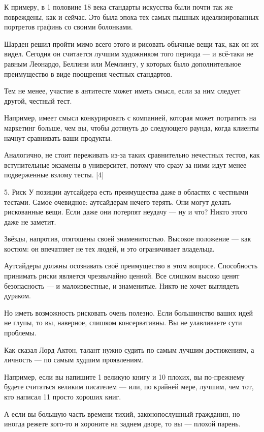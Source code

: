 \documentclass[ebook,12pt,oneside,openany]{memoir}
\begin{document}
К примеру, в 1 половине 18 века стандарты искусства были почти так же
повреждены, как и сейчас. Это была эпоха тех самых пышных
идеализированных портретов графинь со своими болонками.

Шарден решил пройти мимо всего этого и рисовать обычные вещи так, как
он их видел. Сегодня он считается лучшим художником того периода — и
всё-таки не равным Леонардо, Беллини или Мемлингу, у которых было
дополнительное преимущество в виде поощрения честных стандартов.

Тем не менее, участие в антитесте может иметь смысл, если за ним
следует другой, честный тест.

Например, имеет смысл конкурировать с компанией, которая может
потратить на маркетинг больше, чем вы, чтобы дотянуть до следующего
раунда, когда клиенты начнут сравнивать ваши продукты.

Аналогично, не стоит переживать из-за таких сравнительно нечестных
тестов, как вступительные экзамены в университет, потому что сразу за
ними идут менее подверженные взлому тесты. [4]

5. Риск У позиции аутсайдера есть преимущества даже в областях с
честными тестами. Самое очевидное: аутсайдерам нечего терять. Они
могут делать рискованные вещи. Если даже они потерпят неудачу — ну и
что? Никто этого даже не заметит.

Звёзды, напротив, отягощены своей знаменитостью. Высокое положение —
как костюм: он впечатляет не тех людей, и это ограничивает владельца.

Аутсайдеры должны осознавать своё преимущество в этом вопросе.
Способность принимать риски является чрезвычайно ценной. Все слишком
высоко ценят безопасность — и малоизвестные, и знаменитые. Никто не
хочет выглядеть дураком.

Но иметь возможность рисковать очень полезно. Если большинство ваших
идей не глупы, то вы, наверное, слишком консервативны. Вы не
улавливаете сути проблемы.

Как сказал Лорд Актон, талант нужно судить по самым лучшим
достижениям, а личность — по самым худшим проявлениям.

Например, если вы напишите 1 великую книгу и 10 плохих, вы по-прежнему
будете считаться великим писателем — или, по крайней мере, лучшим, чем
тот, кто написал 11 просто хороших книг.

А если вы большую часть времени тихий, законопослушный гражданин, но
иногда режете кого-то и хороните на заднем дворе, то вы — плохой
парень.
\end{document}
